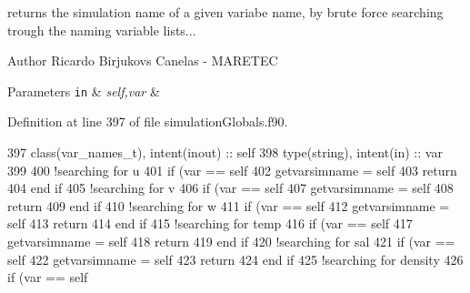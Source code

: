 returns the simulation name of a given variabe name, by brute force searching trough the naming variable lists... 

\begin{DoxyAuthor}{Author}
Ricardo Birjukovs Canelas -\/ M\+A\+R\+E\+T\+EC 
\end{DoxyAuthor}

\begin{DoxyParams}[1]{Parameters}
\mbox{\tt in}  & {\em self,var} & \\
\hline
\end{DoxyParams}


Definition at line 397 of file simulation\+Globals.\+f90.


\begin{DoxyCode}
397     \textcolor{keywordtype}{class}(var\_names\_t), \textcolor{keywordtype}{intent(inout)} :: self
398     \textcolor{keywordtype}{type}(string), \textcolor{keywordtype}{intent(in)} :: var
399 
400     \textcolor{comment}{!searching for u}
401     \textcolor{keywordflow}{if} (var == self%
402         getvarsimname = self%
403         \textcolor{keywordflow}{return}
404 \textcolor{keywordflow}{    end if}
405     \textcolor{comment}{!searching for v}
406     \textcolor{keywordflow}{if} (var == self%
407         getvarsimname = self%
408         \textcolor{keywordflow}{return}
409 \textcolor{keywordflow}{    end if}
410     \textcolor{comment}{!searching for w}
411     \textcolor{keywordflow}{if} (var == self%
412         getvarsimname = self%
413         \textcolor{keywordflow}{return}
414 \textcolor{keywordflow}{    end if}
415     \textcolor{comment}{!searching for temp}
416     \textcolor{keywordflow}{if} (var == self%
417         getvarsimname = self%
418         \textcolor{keywordflow}{return}
419 \textcolor{keywordflow}{    end if}
420     \textcolor{comment}{!searching for sal}
421     \textcolor{keywordflow}{if} (var == self%
422         getvarsimname = self%
423         \textcolor{keywordflow}{return}
424 \textcolor{keywordflow}{    end if}
425     \textcolor{comment}{!searching for density}
426     \textcolor{keywordflow}{if} (var == self%

\end{DoxyCode}
